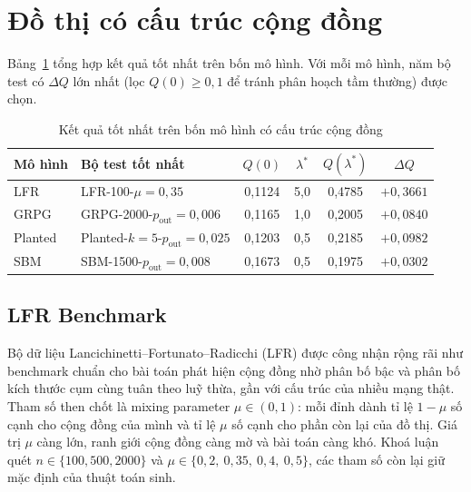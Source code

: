 \section{Đồ thị có cấu trúc cộng đồng}
\label{sec:results-synthetic}

Bảng~\ref{tab:synthetic-summary} tổng hợp kết quả tốt nhất trên bốn mô hình. Với mỗi mô hình, năm bộ test có $\Delta Q$ lớn nhất (lọc $Q(0) \geq 0{,}1$ để tránh phân hoạch tầm thường) được chọn.

\begin{table}[H]
\centering
\caption{Kết quả tốt nhất trên bốn mô hình có cấu trúc cộng đồng}
\label{tab:synthetic-summary}
\begin{tabular}{|l|l|c|c|c|c|}
\hline
\textbf{Mô hình} & \textbf{Bộ test tốt nhất} & $Q(0)$ & $\lambda^*$ & $Q(\lambda^*)$ & $\Delta Q$ \\ \hline
LFR     & LFR-100-$\mu{=}0{,}35$       & 0{,}1124 & 5{,}0    & 0{,}4785 & $+0{,}3661$ \\ \hline
GRPG    & GRPG-2000-$p_{\mathrm{out}}{=}0{,}006$ & 0{,}1165 & 1{,}0 & 0{,}2005 & $+0{,}0840$ \\ \hline
Planted & Planted-$k{=}5$-$p_{\mathrm{out}}{=}0{,}025$ & 0{,}1203 & 0{,}5 & 0{,}2185 & $+0{,}0982$ \\ \hline
SBM     & SBM-1500-$p_{\mathrm{out}}{=}0{,}008$ & 0{,}1673 & 0{,}5 & 0{,}1975 & $+0{,}0302$ \\ \hline
\end{tabular}
\end{table}

\subsection{LFR Benchmark}
\label{subsec:results-lfr}

Bộ dữ liệu Lancichinetti--Fortunato--Radicchi (LFR) được công nhận rộng rãi như benchmark chuẩn cho bài toán phát hiện cộng đồng nhờ phân bố bậc và phân bố kích thước cụm cùng tuân theo luỹ thừa, gần với cấu trúc của nhiều mạng thật. Tham số then chốt là mixing parameter $\mu \in (0, 1)$: mỗi đỉnh dành tỉ lệ $1 - \mu$ số cạnh cho cộng đồng của mình và tỉ lệ $\mu$ số cạnh cho phần còn lại của đồ thị. Giá trị $\mu$ càng lớn, ranh giới cộng đồng càng mờ và bài toán càng khó. Khoá luận quét $n \in \{100, 500, 2000\}$ và $\mu \in \{0{,}2,\ 0{,}35,\ 0{,}4,\ 0{,}5\}$, các tham số còn lại giữ mặc định của thuật toán sinh.

